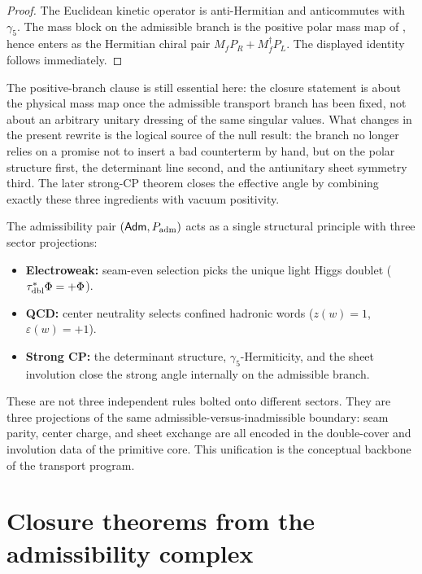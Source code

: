 \begin{proof}
The Euclidean kinetic operator is anti-Hermitian and anticommutes with $\gamma_5$. The mass block
on the admissible branch is the positive polar mass map of , hence
enters as the Hermitian chiral pair $M_fP_R+M_f^\dagger P_L$. The displayed identity follows
immediately.
\end{proof}

The positive-branch clause is still essential here: the closure statement is about the physical
mass map once the admissible transport branch has been fixed, not about an arbitrary unitary
dressing of the same singular values. What changes in the present rewrite is the logical source
of the null result: the branch no longer relies on a promise not to insert a bad counterterm by
hand, but on the polar structure first, the determinant line second, and the antiunitary sheet
symmetry third. The later strong-CP theorem closes the effective angle by combining exactly these
three ingredients with vacuum positivity.

\begin{remark}
The admissibility pair $(\mathsf{Adm},P_{\mathrm{adm}})$ acts as a single structural principle with three sector projections:
\begin{itemize}[leftmargin=1.5em, topsep=3pt, itemsep=2pt]
    \item \textbf{Electroweak:} seam-even selection picks the unique light Higgs doublet ($\tau_{\mathrm{dbl}}^{\ast}\Phi=+\Phi$).
    \item \textbf{QCD:} center neutrality selects confined hadronic words ($z(w)=1$, $\varepsilon(w)=+1$).
    \item \textbf{Strong CP:} the determinant structure, $\gamma_5$-Hermiticity, and the sheet involution close the strong angle internally on the admissible branch.
\end{itemize}
These are not three independent rules bolted onto different sectors. They are three projections of the same admissible-versus-inadmissible boundary: seam parity, center charge, and sheet exchange are all encoded in the double-cover and involution data of the primitive core. This unification is the conceptual backbone of the transport program.
\end{remark}


\section{Closure theorems from the admissibility complex}
\label{sec:closure-theorems}

